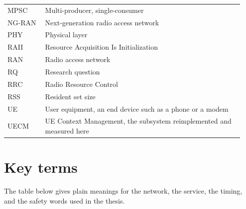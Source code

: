 \documentclass[english,oneside,a4paper,censored,csm,software-track-2020]{HYthesisML}
\begin{document}
\begin{longtable}{@{}p{0.15\linewidth} p{0.79\linewidth}@{}}
MPSC & Multi-producer, single-consumer \\
NG-RAN & Next-generation radio access network \\
PHY & Physical layer \\
RAII & Resource Acquisition Is Initialization \\
RAN & Radio access network \\
RQ & Research question \\
RRC & Radio Resource Control \\
RSS & Resident set size \\
UE & User equipment, an end device such as a phone or a modem \\
UECM & UE Context Management, the subsystem reimplemented and measured here \\
\hline
\end{longtable}
\endgroup

\cleardoublepage
{}
{}
\chapter*{Key terms}
\label{appendix:terms}

\noindent The table below gives plain meanings for the network, the service, the timing, and the safety
words used in the thesis.     
\end{document}
